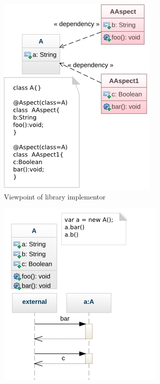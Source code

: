 \begin{figure}[ht]
\begin{subfigure}[b]{0.45\textwidth}
\centering
\includegraphics[width=0.75\linewidth]{chapter2/fig/library-developer-view.png}
\caption{Viewpoint of library implementor}\label{fig:library-view}
\end{subfigure}
\hspace{0.3cm}
\begin{subfigure}[b]{0.45\textwidth}
\centering
\includegraphics[width=0.75\linewidth]{chapter2/fig/user-view.png}

\end{subfigure}
\end{figure}
